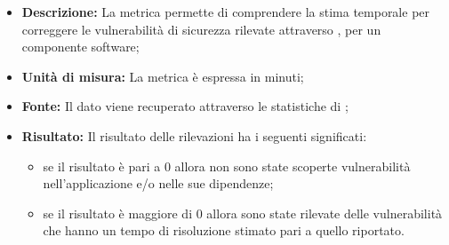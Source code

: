 			\begin{itemize}
      			\item \textbf{Descrizione: }
					La metrica permette di comprendere la stima temporale per correggere le vulnerabilità di sicurezza rilevate attraverso , per un componente software;
				\item \textbf{Unità di misura: }
					La metrica è espressa in minuti;
				\item \textbf{Fonte: }
					Il dato viene recuperato attraverso le statistiche di ;
				\item \textbf{Risultato: }
					Il risultato delle rilevazioni ha i seguenti significati:
					\begin{itemize}
						\item se il risultato è pari a 0 allora non sono state scoperte vulnerabilità nell'applicazione e/o nelle sue dipendenze;
						\item se il risultato è maggiore di 0 allora sono state rilevate delle vulnerabilità che hanno un tempo di risoluzione stimato pari a quello riportato.
					\end{itemize}
			\end{itemize}





